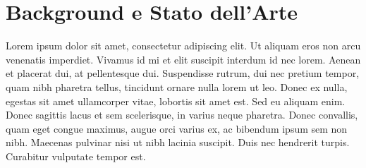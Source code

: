 \chapter{Background e Stato dell'Arte}
Lorem ipsum dolor sit amet, consectetur adipiscing elit. Ut aliquam eros non arcu venenatis imperdiet. Vivamus id mi et elit suscipit interdum id nec lorem. Aenean et placerat dui, at pellentesque dui. Suspendisse rutrum, dui nec pretium tempor, quam nibh pharetra tellus, tincidunt ornare nulla lorem ut leo. Donec ex nulla, egestas sit amet ullamcorper vitae, lobortis sit amet est. Sed eu aliquam enim. Donec sagittis lacus et sem scelerisque, in varius neque pharetra. Donec convallis, quam eget congue maximus, augue orci varius ex, ac bibendum ipsum sem non nibh. Maecenas pulvinar nisi ut nibh lacinia suscipit. Duis nec hendrerit turpis. Curabitur vulputate tempor est. 